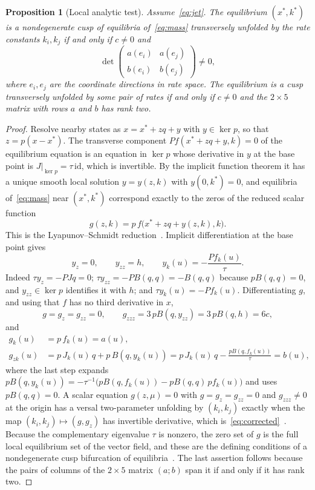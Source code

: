\documentclass[11pt,a4paper]{article}
\theoremstyle{plain}
\newtheorem{proposition}[theorem]{Proposition}
\theoremstyle{definition}
\theoremstyle{remark}
\numberwithin{equation}{section}
\newcommand{\Ker}{\operatorname{ker}}
\begin{document}
\begin{proposition}[Local analytic test]\label{prop:analytic}
Assume~\eqref{eq:jet}. The equilibrium $(x^*,k^*)$ is a nondegenerate cusp of equilibria of~\eqref{eq:mass} transversely unfolded by the rate constants $k_i,k_j$ if and only if $c\ne0$ and
\begin{equation}\label{eq:corrected}
 \det\begin{pmatrix}a(e_i)&a(e_j)\\ b(e_i)&b(e_j)\end{pmatrix}\ne0,
\end{equation}
where $e_i,e_j$ are the coordinate directions in rate space. The equilibrium is a cusp transversely unfolded by \emph{some} pair of rates if and only if $c\ne0$ and the $2\times5$ matrix with rows $a$ and $b$ has rank two.
\end{proposition}

\begin{proof}
Resolve nearby states as $x=x^*+zq+y$ with $y\in\Ker p$, so that $z=p(x-x^*)$. The transverse component $Pf(x^*+zq+y,k)=0$ of the equilibrium equation is an equation in $\Ker p$ whose derivative in $y$ at the base point is $J|_{\Ker p}=\tau\,\mathrm{id}$, which is invertible. By the implicit function theorem it has a unique smooth local solution $y=y(z,k)$ with $y(0,k^*)=0$, and equilibria of~\eqref{eq:mass} near $(x^*,k^*)$ correspond exactly to the zeros of the reduced scalar function
\[
 g(z,k)=p\,f\bigl(x^*+zq+y(z,k),k\bigr).
\]
This is the Lyapunov--Schmidt reduction~\citep[Chapter~I]{GS1985}. Implicit differentiation at the base point gives
\[
 y_z=0,\qquad y_{zz}=h,\qquad y_k(u)=-\frac{Pf_k(u)}{\tau}.
\]
Indeed $\tau y_z=-PJq=0$; $\tau y_{zz}=-PB(q,q)=-B(q,q)$ because $pB(q,q)=0$, and $y_{zz}\in\Ker p$ identifies it with $h$; and $\tau y_k(u)=-Pf_k(u)$. Differentiating $g$, and using that $f$ has no third derivative in $x$,
\[
 g=g_z=g_{zz}=0,\qquad g_{zzz}=3\,pB(q,y_{zz})=3\,pB(q,h)=6c,
\]
and
\[
 \begin{aligned}
 g_k(u)&=p\,f_k(u)=a(u),\\
 g_{zk}(u)&=p\,J_k(u)\,q+p\,B(q,y_k(u))=p\,J_k(u)\,q-\frac{pB(q,f_k(u))}{\tau}=b(u),
 \end{aligned}
\]
where the last step expands $pB(q,y_k(u))=-\tau^{-1}\bigl(pB(q,f_k(u))-pB(q,q)\,pf_k(u)\bigr)$ and uses $pB(q,q)=0$. A scalar equation $g(z,\mu)=0$ with $g=g_z=g_{zz}=0$ and $g_{zzz}\ne0$ at the origin has a versal two-parameter unfolding by $(k_i,k_j)$ exactly when the map $(k_i,k_j)\mapsto(g,g_z)$ has invertible derivative, which is~\eqref{eq:corrected}~\citep[Chapter~III, the cusp or hysteresis normal form $z^3$]{GS1985}. Because the complementary eigenvalue $\tau$ is nonzero, the zero set of $g$ is the full local equilibrium set of the vector field, and these are the defining conditions of a nondegenerate cusp bifurcation of equilibria~\citep[Section~8.2]{Kuznetsov2004}. The last assertion follows because the pairs of columns of the $2\times5$ matrix $(a;b)$ span it if and only if it has rank two.
\end{proof}
\end{document}
